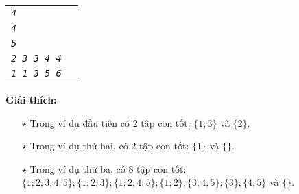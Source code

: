 \begin{ex}
\begin{center}
\begin{tabular}{|l|l|}
			\textit{\texttt{4}}                &                                     \\
			\textit{\texttt{4}}                &                                     \\
			\textit{\texttt{5}}                &                                     \\
			\textit{\texttt{2 3 3 4 4}}        &                                     \\
			\textit{\texttt{1 1 3 5 6}}        &                                     \\
			\hline
		\end{tabular}
	\end{center}
	\textbf{Giải thích: }
	\begin{itemize}
		\item[$\star$] Trong ví dụ đầu tiên có $2$ tập con tốt: $\{1;3\}$ và $\{2\}$.
		\item[$\star$] Trong ví dụ thứ hai, có $2$ tập con tốt: $\{1\}$ và $\{\}$.
		\item[$\star$] Trong ví dụ thứ ba, có $8$ tập con tốt: $\{1;2;3;4;5\}; \{1;2;3\}; \{1;2;4;5\}; \{1;2\}; \{3;4;5\}; \{3\}; \{4;5\}$ và $\{\}$.
	\end{itemize}
\end{ex}

